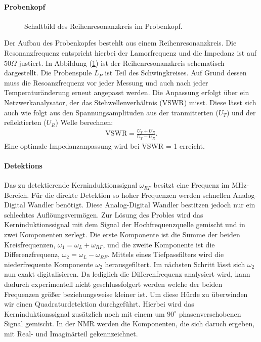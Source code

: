 \paragraph{Probenkopf}
\begin{figure}
	\centering
	\caption{Schaltbild des Reihenresonanzkreis im Probenkopf.}
	\label{probenkopf.}
\end{figure}
Der Aufbau des Probenkopfes bestehlt aus einem Reihenresonanzkreis.
Die Resonanzfrequenz entspricht hierbei der Lamorfrequenz und die Impedanz ist auf $50 \Omega$ justiert.
In Abbildung (\ref{probenkopf.}) ist der Reihenresonanzkreis schematisch dargestellt.
Die Probenspule $L_P$ ist Teil des Schwingkreises.
Auf Grund dessen muss die Resoanzfrequenz vor jeder Messung und auch nach jeder Temperatur\"{a}nderung erneut angepasst werden.
Die Anpassung erfolgt \"{u}ber ein Netzwerkanalysator, der das Stehwellenverhältnis (VSWR) misst.
Diese l\"{a}sst sich auch wie folgt aus den Spannungsamplituden aus der tranmitterten ($U_T$) und der reflektierten ($U_R$) Welle berechnen:
\begin{align*}
	\text{VSWR} = \frac{U_T + U_R}{U_T - U_R} .
\end{align*}
Eine optimale Impedanzanpassung wird bei VSWR = 1 erreicht.

\paragraph{Detektions}
Das zu detektierende Kerninduktionssignal $\omega_{RF}$ besitzt eine Frequenz im MHz-Bereich.
F\"{u}r die direkte Detektion so hoher Frequenzen werden schnellen Analog-Digital Wandler ben\"{o}tigt.
Diese Analog-Digital Wandler bestitzen jedoch nur ein schlechtes Aufl\"{o}ungsverm\"{o}gen.
Zur L\"{o}sung des Probles wird das Kerninduktionssignal mit dem Signal der Hochfrequenzquelle gemischt und in zwei Komponenten zerlegt.
Die erste Komponente ist die Summe der beiden Kreisfrequenzen, $\omega_1 = \omega_L + \omega_{RF}$, und die zweite Komponente ist die Differenzfrequenz, $\omega_2 = \omega_L - \omega_{RF}$.
Mittels eines Tiefpassfilters wird die niederfrequente Komponente $\omega_2$ herausgefiltert.
Im n\"{a}chsten Schritt l\"{a}sst sich $\omega_2$ nun exakt digitalisieren.
Da lediglich die Differenfrequenz analysiert wird, kann dadurch experimentell nicht geschlussfolgert werden welche der beiden Frequenzen gr\"{o}{\ss}er beziehungsweise kleiner ist.
Um diese H\"{u}rde zu \"{u}berwinden wir einen Quadraturdetektion durchgef\"{u}hrt.
Hierbei wird das Kerninduktionssignal zus\"{a}tzlich noch mit einem um $90^{\circ}$ phasenverschobenen Signal gemischt.
In der NMR werden die Komponenten, die sich daruch ergeben, mit Real- und Imagin\"{a}rteil gekennzeichnet.

